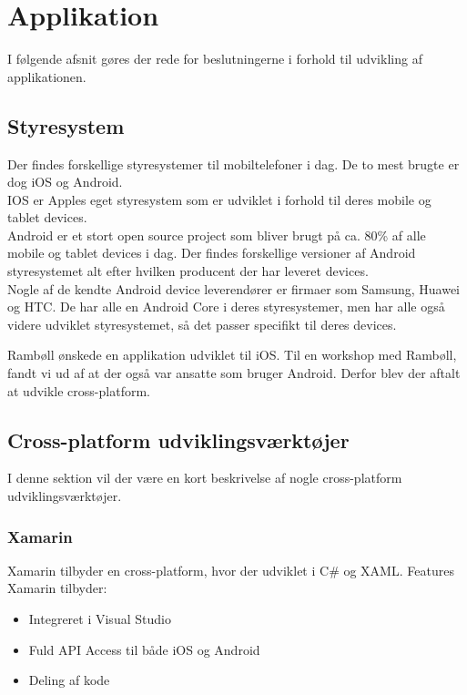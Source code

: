 \section{Applikation}                                   
I følgende afsnit gøres der rede for beslutningerne i forhold til udvikling af applikationen.

\subsection{Styresystem}
Der findes forskellige styresystemer til mobiltelefoner i dag. De to mest brugte er dog iOS \cite{iOS} og Android. \cite{Android} \\
IOS er Apples eget styresystem som er udviklet i forhold til deres mobile og tablet devices. \\
Android er et stort open source project som bliver brugt på ca. 80\% af alle mobile og tablet devices i dag. Der findes forskellige versioner af Android styresystemet alt efter hvilken producent der har leveret devices. \\
Nogle af de kendte Android device leverendører er firmaer som Samsung, Huawei og HTC. De har alle en Android Core i deres styresystemer, men har alle også videre udviklet styresystemet, så det passer specifikt til deres devices.

Rambøll ønskede en applikation udviklet til iOS. Til en workshop med Rambøll, fandt vi ud af at der også var ansatte som bruger Android. Derfor blev der aftalt at udvikle cross-platform.

\subsection{Cross-platform udviklingsværktøjer}
I denne sektion vil der være en kort beskrivelse af nogle cross-platform udviklingsværktøjer.

\subsubsection{Xamarin}
Xamarin tilbyder en cross-platform, hvor der udviklet i C\#\cite{CSharp} og XAML\cite{XAML}.
Features Xamarin tilbyder:
\begin{itemize}[-]
	\item Integreret i Visual Studio
	\item Fuld API Access til både iOS og Android
	\item Deling af kode
\end{itemize}

